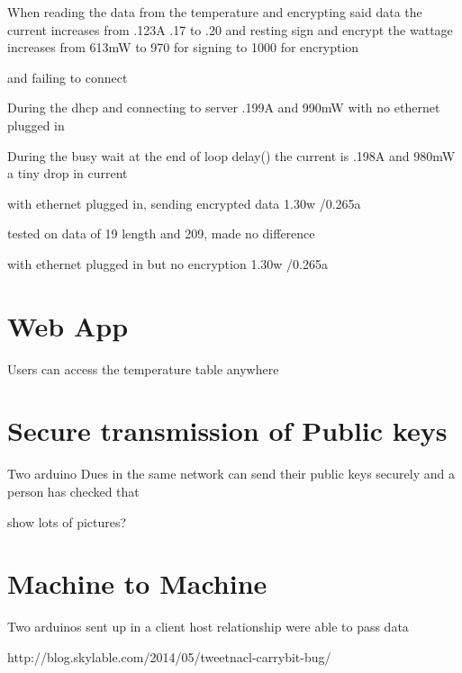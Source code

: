 When reading the data from the temperature and encrypting said data
the current increases from .123A  .17 to .20 and
					resting sign and encrypt
the wattage increases from 613mW to 970 for signing to 1000 for encryption

				and failing to connect		
				
During the dhcp and connecting to server .199A and 990mW with no ethernet plugged in

During the busy wait at the end of loop delay() the current is .198A and 980mW
a tiny drop in current


with ethernet plugged in, sending encrypted data
1.30w /0.265a

tested on data of 19 length and 209, made no difference

with ethernet plugged in but no encryption
1.30w /0.265a

\section{Web App}

Users can access the temperature table anywhere 

\section{Secure transmission of Public keys}

Two arduino Dues in the same network can send their public keys securely and a person has checked that

show lots of pictures?

\section{Machine to Machine}

Two arduinos sent up in a client host relationship were able to pass data

http://blog.skylable.com/2014/05/tweetnacl-carrybit-bug/